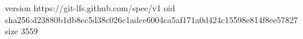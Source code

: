 version https://git-lfs.github.com/spec/v1
oid sha256:d23880b1db8ec5d38c026c1adce6004ca5af171a0d424c15598e814f8ee57827
size 3559
